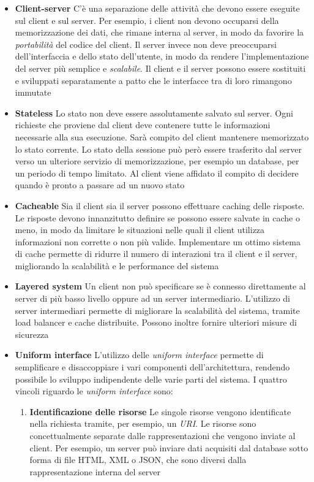 \begin{itemize}
	\item \textbf{Client-server} C'è una separazione delle attività che devono essere eseguite sul client e sul server. Per esempio, i client non devono occuparsi della memorizzazione dei dati, che rimane interna al server, in modo da favorire la \emph{portabilità} del codice del client. Il server invece non deve preoccuparsi dell'interfaccia e dello stato dell'utente, in modo da rendere l'implementazione del server più semplice e \emph{scalabile}. Il client e il server possono essere sostituiti e sviluppati separatamente a patto che le interfacce tra di loro rimangono immutate
	\item \textbf{Stateless} Lo stato non deve essere assolutamente salvato sul server. Ogni richieste che proviene dal client deve contenere tutte le informazioni necessarie alla sua esecuzione. Sarà compito del client mantenere memorizzato lo stato corrente. Lo stato della sessione può però essere trasferito dal server verso un ulteriore servizio di memorizzazione, per esempio un database, per un periodo di tempo limitato. Al client viene affidato il compito di decidere quando è pronto a passare ad un nuovo stato
	\item \textbf{Cacheable} Sia il client sia il server possono effettuare caching delle risposte. Le risposte devono innanzitutto definire se possono essere salvate in cache o meno, in modo da limitare le situazioni nelle quali il client utilizza informazioni non corrette o non più valide. Implementare un ottimo sistema di cache permette di ridurre il numero di interazioni tra il client e il server, migliorando la scalabilità e le performance del sistema
	\item \textbf{Layered system} Un client non può specificare se è connesso direttamente al server di più basso livello oppure ad un server intermediario. L'utilizzo di server intermediari permette di migliorare la scalabilità del sistema, tramite load balancer e cache distribuite. Possono inoltre fornire ulteriori misure di sicurezza
	\item \textbf{Uniform interface} L'utilizzo delle \emph{uniform interface} permette di semplificare e disaccoppiare i vari componenti dell'architettura, rendendo possibile lo sviluppo indipendente delle varie parti del sistema. I quattro vincoli riguardo le \emph{uniform interface} sono:
	\begin{enumerate}
		\item \textbf{Identificazione delle risorse} Le singole risorse vengono identificate nella richiesta tramite, per esempio, un \emph{URI}. Le risorse sono concettualmente separate dalle rappresentazioni che vengono inviate al client. Per esempio, un server può inviare dati acquisiti dal database sotto forma di file HTML, XML o JSON, che sono diversi dalla rappresentazione interna del server

\end{enumerate}
\end{itemize}
